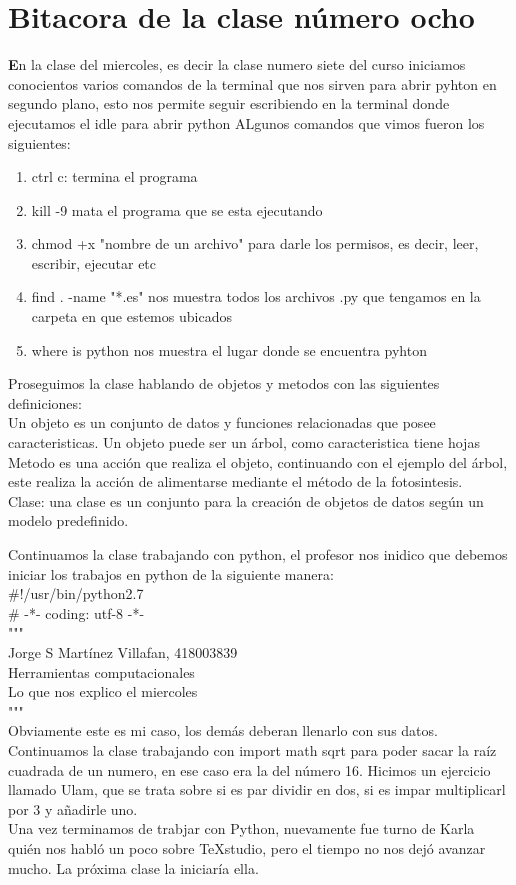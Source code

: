 \documentclass{book}
\begin{document}
\section{Bitacora de la clase número ocho}
\textbf En la clase del miercoles, es decir la clase numero siete del curso iniciamos conocientos varios comandos de la terminal que nos sirven para abrir pyhton en segundo plano, esto nos permite seguir escribiendo en la terminal donde ejecutamos el idle para abrir python
ALgunos comandos que vimos fueron los siguientes:
\begin{enumerate}
	\item ctrl c: termina el programa
	\item kill -9 mata el programa que se esta ejecutando
	\item chmod +x "nombre de un archivo" para darle los permisos, es decir, leer, escribir, ejecutar etc
	\item find . -name "*.es" nos muestra todos los archivos .py que tengamos en la carpeta en que estemos ubicados
	\item where is python nos muestra el lugar donde se encuentra pyhton
\end{enumerate}
Proseguimos la clase hablando de objetos y metodos con las siguientes definiciones:\\
Un objeto es un conjunto de datos y funciones relacionadas que posee caracteristicas. Un objeto puede ser un árbol, como caracteristica tiene hojas\\
Metodo es una acción que realiza el objeto, continuando con el ejemplo del árbol, este realiza la acción de alimentarse mediante el método de la fotosintesis. \\
Clase: una clase es un conjunto para la creación de objetos de datos según un modelo predefinido.

Continuamos la clase trabajando con python, el profesor nos inidico que debemos iniciar los trabajos en python de la siguiente manera:\\

\#!/usr/bin/python2.7\\
\# -*- coding: utf-8 -*-\\
"""\\
Jorge S Martínez Villafan, 418003839\\
Herramientas computacionales\\
Lo que nos explico el miercoles\\
"""\\
Obviamente este es mi caso, los demás deberan llenarlo con sus datos.
Continuamos la clase trabajando con import math sqrt para poder sacar la raíz cuadrada de un numero, en ese caso era la del número 16. Hicimos un ejercicio llamado Ulam, que se trata sobre si es par dividir en dos, si es impar multiplicarl por 3 y añadirle uno. \\
Una vez terminamos de trabjar con Python, nuevamente fue turno de Karla quién nos habló un poco sobre TeXstudio, pero el tiempo no nos dejó avanzar mucho. La próxima clase la iniciaría ella.
\end{document}
